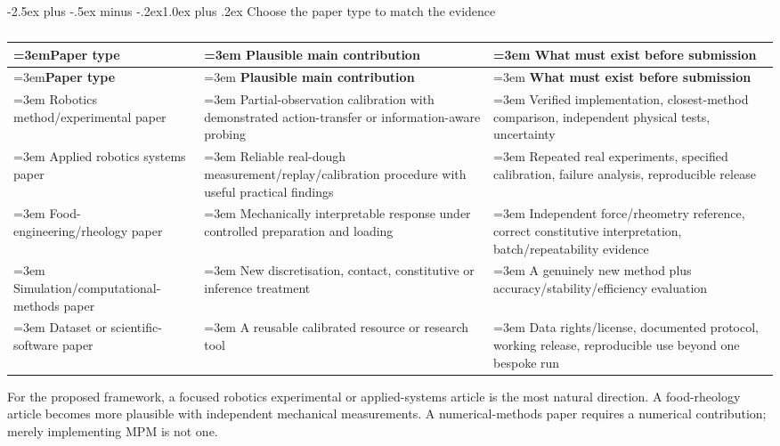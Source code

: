 \documentclass[
  11pt,
]{article}
\makeatletter
\renewcommand\subsection{\needspace{5\baselineskip}\@startsection{subsection}{2}{\z@}%
  {-2.5ex plus -.5ex minus -.2ex}{1.0ex plus .2ex}%
  {\normalfont\sffamily\large\bfseries\color{accent}}}
\makeatother
\begin{document}
\subsection{Choose the paper type to match the
evidence}\label{choose-the-paper-type-to-match-the-evidence}

\begin{small}
\begin{longtable}{@{}>{\raggedright\sloppy\emergencystretch=3em\arraybackslash}p{} >{\raggedright\sloppy\emergencystretch=3em\arraybackslash}p{} >{\raggedright\sloppy\emergencystretch=3em\arraybackslash}p{}@{}}
\caption{}\\
\toprule
\textbf{Paper type} & \textbf{Plausible main contribution} & \textbf{What must exist before submission} \\
\midrule
\endfirsthead
\toprule
\textbf{Paper type} & \textbf{Plausible main contribution} & \textbf{What must exist before submission} \\
\midrule
\endhead
Robotics method/experimental paper & Partial-observation calibration with demonstrated action-transfer or
information-aware probing & Verified implementation, closest-method comparison, independent physical
tests, uncertainty \\
\hline
Applied robotics systems paper & Reliable real-dough measurement/replay/calibration procedure with useful
practical findings & Repeated real experiments, specified calibration, failure analysis,
reproducible release \\
\hline
Food-engineering/rheology paper & Mechanically interpretable response under controlled preparation and
loading & Independent force/rheometry reference, correct constitutive
interpretation, batch/repeatability evidence \\
\hline
Simulation/computational-methods paper & New discretisation, contact, constitutive or inference treatment & A genuinely new method plus accuracy/stability/efficiency evaluation \\
\hline
Dataset or scientific-software paper & A reusable calibrated resource or research tool & Data rights/license, documented protocol, working release, reproducible
use beyond one bespoke run \\
\bottomrule
\end{longtable}
\end{small}

For the proposed framework, a focused robotics experimental or
applied-systems article is the most natural direction. A food-rheology
article becomes more plausible with independent mechanical measurements.
A numerical-methods paper requires a numerical contribution; merely
implementing MPM is not one.
\end{document}
